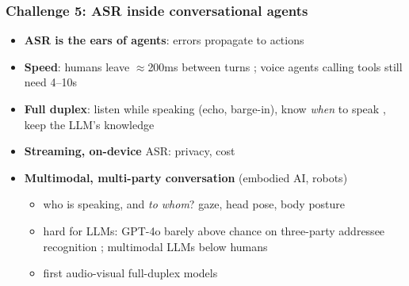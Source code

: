 \documentclass[table]{beamer}
\begin{document}
\begin{frame}
\frametitle{Challenge 5: ASR inside conversational agents}
\small
\begin{itemize}
	\item \textbf{ASR is the ears of agents}: errors propagate to actions
	\item \textbf{Speed}: humans leave $\approx$200ms between turns \citep{stivers2009universals} ; voice agents calling tools still need 4--10s \citep{lin2026fdbv3}
	\item \textbf{Full duplex}: listen while speaking (echo, barge-in), know \textit{when} to speak \citep{peng2026takefloor}, keep the LLM's knowledge
	\item \textbf{Streaming, on-device} ASR: privacy, cost
	\item \textbf{Multimodal, multi-party conversation} (embodied AI, robots)
	\begin{itemize}
		\item who is speaking, and \textit{to whom}? gaze, head pose, body posture \citep{mazzola2023addressee}
		\item hard for LLMs: GPT-4o barely above chance on three-party addressee recognition \citep{inoue2025addressee} ; multimodal LLMs below humans \citep{fukuda2026addressee}
		\item first audio-visual full-duplex models \citep{huang2026duplexomni}
	\end{itemize}
\end{itemize}
\end{frame}

\end{document}
